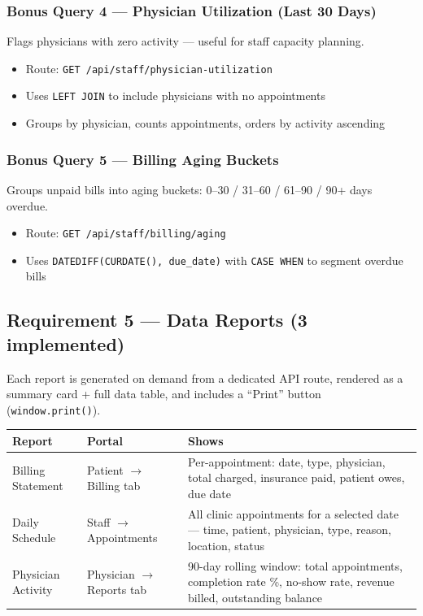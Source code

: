 \documentclass[12pt, letterpaper]{article}
\begin{document}
\subsubsection{Bonus Query 4 — Physician Utilization (Last 30 Days)}
Flags physicians with zero activity — useful for staff capacity planning.
\begin{itemize}
  \item Route: \texttt{GET /api/staff/physician-utilization}
  \item Uses \texttt{LEFT JOIN} to include physicians with no appointments
  \item Groups by physician, counts appointments, orders by activity ascending
\end{itemize}

\subsubsection{Bonus Query 5 — Billing Aging Buckets}
Groups unpaid bills into aging buckets: 0--30 / 31--60 / 61--90 / 90+ days overdue.
\begin{itemize}
  \item Route: \texttt{GET /api/staff/billing/aging}
  \item Uses \texttt{DATEDIFF(CURDATE(), due\_date)} with \texttt{CASE WHEN} to segment overdue bills
\end{itemize}

\subsection{Requirement 5 — Data Reports (3 implemented)}

\begin{greenbox}
Each report is generated on demand from a dedicated API route, rendered as a summary card + full data table, and includes a ``Print'' button (\texttt{window.print()}).
\end{greenbox}

\begin{center}
\begin{tabularx}{\linewidth}{llX}
  \toprule
  \textbf{Report} & \textbf{Portal} & \textbf{Shows} \\
  \midrule
  Billing Statement     & Patient $\rightarrow$ Billing tab    & Per-appointment: date, type, physician, total charged, insurance paid, patient owes, due date \\[4pt]
  Daily Schedule        & Staff $\rightarrow$ Appointments     & All clinic appointments for a selected date — time, patient, physician, type, reason, location, status \\[4pt]
  Physician Activity    & Physician $\rightarrow$ Reports tab  & 90-day rolling window: total appointments, completion rate \%, no-show rate, revenue billed, outstanding balance \\
  \bottomrule
\end{tabularx}
\end{center}
\end{document}
